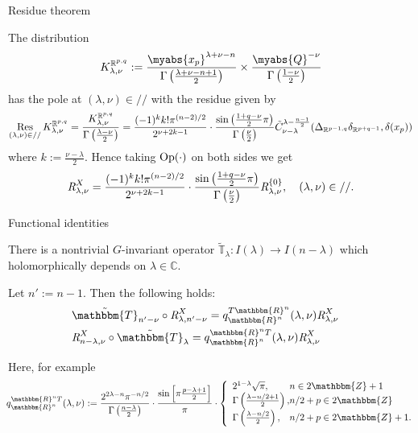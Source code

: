 \documentclass[pdf]{beamer}
\newcommand{\assign}{:=}
\newcommand{\Op}{\mbox{\normalfont Op}}
\newcommand{\Res}{\operatorname{Res}\displaylimits}
\newcommand{\OpR}{\mbox{\it R}}
\theoremstyle{mystyle}
\theoremstyle{remark}
\begin{document}
\begin{frame}{Residue theorem}
	\begin{theorem}
		The distribution
		\[K_{\lambda,\nu}^{\mathbb{R}^{p,q}}:=\frac{\myabs{x_p}^{\lambda+\nu-n}}{\Gamma\left( \frac{\lambda+\nu-n+1}{2} \right)}\times
		\frac{\myabs{Q}^{-\nu}}{\Gamma\left( \frac{1-\nu}{2} \right)}\]
		has the pole at $(\lambda,\nu)\in//$ with the residue given by
		{\footnotesize
		\[\Res_{(\lambda,\nu)\in//}K_{\lambda,\nu}^{\mathbb{R}^{p,q}}=\frac{K_{\lambda,\nu}^{\mathbb{R}^{p,q}}}{\Gamma\left( \frac{\lambda-\nu}{2} \right)}
			=\frac{ (- 1)^k k!\pi^{(n - 2) / 2} 
		}{2^{ \nu + 2 k-1}}\cdot  \frac{\sin\left( \frac{1+q-\nu}{2}\pi \right)}{\Gamma\left( \frac{\nu}{2} \right)}
	\tilde{C}_{\nu - \lambda}^{\lambda - \frac{n
  	- 1}{2}} ({\Delta}_{\mathbb{R}^{p-1,q}} {\delta}_{\mathbb{R}^{p+q-1}}, \delta (x_p))
		\]
		}
		where $k:=\frac{\nu-\lambda}{2}$.
		Hence taking $\Op(\cdot)$ on both sides we get
  \[\OpR_{\lambda,\nu}^X  = \frac{ (- 1)^k k!\pi^{(n - 2) / 2} 
		}{2^{ \nu + 2 k-1}}\cdot  \frac{\sin\left( \frac{1+q-\nu}{2}\pi \right)}{\Gamma\left( \frac{\nu}{2} \right)}
     \OpR_{\lambda,\nu}^{ \left\{ 0 \right\} },\quad(\lambda,\nu)\in// . \]
	\end{theorem}
\end{frame}
\begin{frame}{Functional identities}
	\begin{fact}
		There is a nontrivial $G$-invariant operator $\tilde{\mathbb{T}}_{\lambda}:I(\lambda)\to I(n-\lambda)$ which holomorphically depends on $\lambda\in \mathbb{C}$.
	\end{fact}
	\begin{theorem}
		Let $n':=n-1$. Then the following holds:
\begin{eqnarray}
	& \tilde{\mathbbm{T}}_{n' - \nu} \circ \OpR^X_{\lambda,n'-\nu}= q^{T\mathbbm{R}^n}_{\mathbbm{R}^n} (\lambda,
  \nu) \OpR^X_{\lambda,\nu} &  \nonumber\\
  & \OpR^X_{n-\lambda,\nu} \circ
  \tilde{\mathbbm{T}}_{\lambda} = q^{\mathbbm{R}^n T}_{\mathbbm{R}^n}
  (\lambda, \nu) \OpR^X_{\lambda,\nu} & \nonumber
\end{eqnarray}

\pause
Here, for example
\begin{equation*}
	\kern-0.1cm
  q^{\mathbbm{R}^n T}_{\mathbbm{R}^n} (\lambda, \nu) \assign \frac{2^{2
  \lambda - n} \pi^{- n / 2}}{\Gamma \left( \frac{n - \lambda}{2} \right)}
  \cdot \frac{\sin \left[ \pi \frac{p - \lambda + 1}{2} \right]}{\pi} \cdot
  \left\{ \begin{array}{l@{}l@{}}
    2^{1 - \lambda} \sqrt{\pi}, & n \in 2\mathbbm{Z}+ 1\\
    \Gamma \left( \frac{\lambda - n / 2 + 1}{2} \right), & n / 2 + p \in
    2\mathbbm{Z}\\
    \Gamma \left( \frac{\lambda - n / 2}{2} \right), & n / 2 + p \in
    2\mathbbm{Z}+ 1.
  \end{array} \right.
\end{equation*}
	\end{theorem}
\end{frame}
\end{document}
